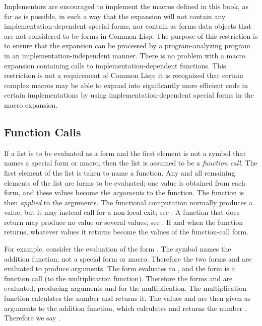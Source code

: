 \beforenoterule
\begin{implementation}
Implementors are encouraged to implement the macros
defined in this book, as far as is possible, in such a way that
the expansion will not contain any implementation-dependent
special forms, nor contain as forms data objects that
are not considered to be forms in Common Lisp.
The purpose of this restriction is to ensure that the expansion
can be processed by a program-analyzing program in an
implementation-independent manner.
There is no problem with a macro expansion containing
calls to implementation-dependent functions.
This restriction is not a requirement of Common Lisp; it is recognized
that certain complex macros may be able to expand into significantly
more efficient code in certain implementations
by using implementation-dependent special forms in the macro expansion.
\end{implementation}
\afternoterule

\subsection{Function Calls}

If a list is to be evaluated as a form and the first element is
not a symbol that names a special form or macro, then the list
is assumed to be a \emph{function call}.  The first element of the
list is taken to name a function.  Any and all remaining elements
of the list are forms to be evaluated; one value is obtained
from each form,
and these values become the \emph{arguments} to the function.
The function is then \emph{applied} to the arguments.
The functional computation normally produces a value,
but it may instead call for a non-local exit; see .
A function that does return may produce no value or several values;
see .
If and when the function returns, whatever values it returns
become the values of the function-call form.

For example, consider the evaluation of the form .
The symbol \cdf{+} names the addition function, not a special form or macro.
Therefore the two forms  and  are evaluated to produce
arguments.  The form  evaluates to , and the form
 is a function call (to the multiplication function).
Therefore the forms  and  are evaluated, producing arguments
 and  for the multiplication.  The multiplication function
calculates the number  and returns it.  The values  and 
are then given as arguments to the addition function, which calculates
and returns the number .  Therefore we say .

